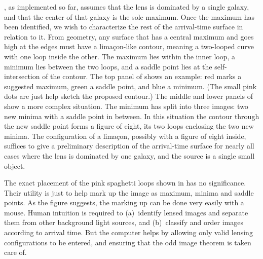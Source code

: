 \spl, as implemented so far, assumes that the lens is dominated by a
single galaxy, and that the center of that galaxy is the sole maximum.
Once the maximum has been identified, we wish to characterize the rest
of the arrival-time surface in relation to it.  From geometry, any
surface that has a central maximum and goes high at the edges must
have a lima\c con-like contour, meaning a two-looped curve with one
loop inside the other.  The maximum lies within the inner loop, a
minimum lies between the two loops, and a saddle point lies at the
self-intersection of the contour.  The top panel of
 shows an example: red marks a suggested
maximum, green a saddle point, and blue a minimum.  (The small pink
dots are just help sketch the proposed contour.)  The middle and lower
panels of  show a more complex situation.
The minimum has split into three images: two new minima with a saddle
point in between.  In this situation the contour through the new
saddle point forms a figure of eight, its two loops enclosing the two
new minima.  The configuration of a lima\c con, possibly with a figure
of eight inside, suffices to give a preliminary description of the
arrival-time surface for nearly all cases where the lens is dominated
by one galaxy, and the source is a single small object.

The exact placement of the pink spaghetti loops shown in
 has no significance.  Their utility is
just to help mark up the image as maximum, minima and saddle points.
As the figure suggests, the marking up can be done very easily with a
mouse.  Human intuition is required to (a)~identify lensed images and
separate them from other background light sources, and (b)~classify
and order images according to arrival time.  But the computer helps by
allowing only valid lensing configurations to be entered, and ensuring
that the odd image theorem is taken care of.%

